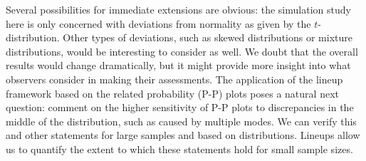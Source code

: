 \documentclass[12pt]{article}\usepackage[]{graphicx}\usepackage[]{color}
\begin{document}
Several possibilities for immediate extensions are obvious: the simulation study here is only concerned with deviations from normality as given by the $t$-distribution. Other types of deviations, such as skewed distributions or mixture distributions, would be interesting to consider as well. We doubt that the overall results would change dramatically, but it might provide more insight into what observers consider in making their assessments. 
The application of the lineup framework based on the related probability (P-P) plots poses a natural next question: \citet{koehler91} comment on the higher sensitivity of  P-P plots  to discrepancies in the middle of the distribution, such as caused by multiple modes. We can verify this and other statements for large samples and based on distributions. Lineups allow us to quantify the extent to which these statements hold for small sample sizes.




\end{document}
